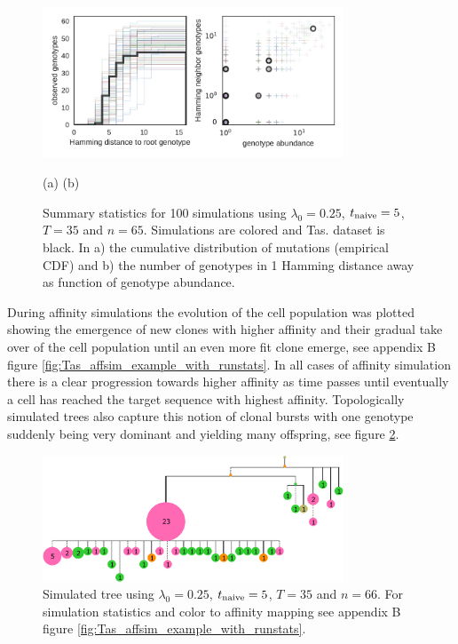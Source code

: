 \begin{figure}
    \begin{center}
    \includegraphics[width=0.8\textwidth]{figures/Tas-affsim_Tas-data.pdf}\newline%
    \end{center}
    \vspace{-14mm} \hspace{42mm} (a) \hspace{52mm} (b)
    \caption{
        \label{fig:Tas-affsim_Tas-data}
        Summary statistics for 100 simulations using $\lambda_0=0.25$, $t_{\text{naive}}=5$, $T=35$ and $n=65$.
        Simulations are colored and Tas. dataset is black.
        In a) the cumulative distribution of mutations (empirical CDF) and b) the number of genotypes in 1 Hamming distance away as function of genotype abundance.
    }
\end{figure}


During affinity simulations the evolution of the cell population was plotted showing the emergence of new clones with higher affinity and their gradual take over of the cell population until an even more fit clone emerge, see appendix B figure \ref{fig:Tas_affsim_example_with_runstats}.
In all cases of affinity simulation there is a clear progression towards higher affinity as time passes until eventually a cell has reached the target sequence with highest affinity.
Topologically simulated trees also capture this notion of clonal bursts with one genotype suddenly being very dominant and yielding many offspring, see figure \ref{fig:Tas_affsim_example.collapsed_runstat_color_tree}.

\begin{figure}
    \centering
    \includegraphics[width=0.8\textwidth]{figures/Tas_affsim_example_collapsed_runstat_color_tree.pdf}
    \caption{
        \label{fig:Tas_affsim_example.collapsed_runstat_color_tree}
        Simulated tree using $\lambda_0=0.25$, $t_{\text{naive}}=5$, $T=35$ and $n=66$.
        For simulation statistics and color to affinity mapping see appendix B figure \ref{fig:Tas_affsim_example_with_runstats}.
    }
\end{figure}





